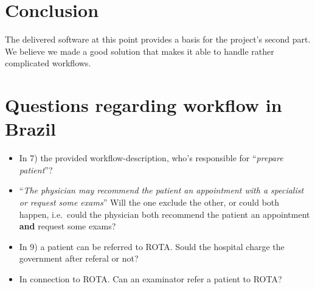 \section{Conclusion}\label{conclusion}

The delivered software at this point provides a basis for the project's
second part. We believe we made a good solution that makes it able to
handle rather complicated workflows.

\section{Questions regarding workflow in
Brazil}\label{questions-regarding-workflow-in-brazil}

\begin{itemize}
\itemsep1pt\parskip0pt
\item
  In 7) the provided workflow-description, who's responsible for
  ``\emph{prepare patient}''?
\item
  ``\emph{The physician may recommend the patient an appointment with a
  specialist or request some exams}'' Will the one exclude the other, or
  could both happen, i.e.~could the physician both recommend the patient
  an appointment \textbf{and} request some exams?
\item
  In 9) a patient can be referred to ROTA. Sould the hospital charge the
  government after referal or not?
\item
  In connection to ROTA. Can an examinator refer a patient to ROTA?
\end{itemize}
